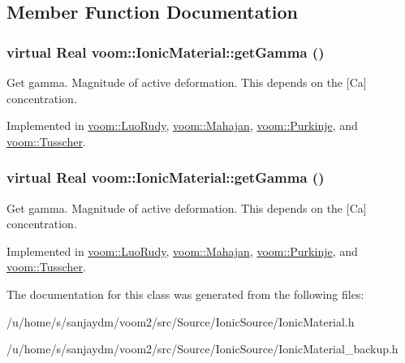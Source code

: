 \subsection{Member Function Documentation}
\hypertarget{classvoom_1_1_ionic_material_a98f1fa5bc5fa9ff6abfcd302111f8eac}{
\subsubsection[{getGamma}]{\setlength{\rightskip}{0pt plus 5cm}virtual Real voom::IonicMaterial::getGamma ()}}
\label{classvoom_1_1_ionic_material_a98f1fa5bc5fa9ff6abfcd302111f8eac}
Get gamma. Magnitude of active deformation. This depends on the \mbox{[}Ca\mbox{]} concentration. 

Implemented in \hyperlink{classvoom_1_1_luo_rudy_a698189fa1a8c96e7b443f95a9d7887be}{voom::LuoRudy}, \hyperlink{classvoom_1_1_mahajan_a909c20c75a95d45e00ead8930b4b3287}{voom::Mahajan}, \hyperlink{classvoom_1_1_purkinje_a337aa8f4b1ea0bd6f08635950cc39a2d}{voom::Purkinje}, and \hyperlink{classvoom_1_1_tusscher_a1c3c2dd28860736ebeb0f602a6b8caa8}{voom::Tusscher}.\hypertarget{classvoom_1_1_ionic_material_a98f1fa5bc5fa9ff6abfcd302111f8eac}{
\subsubsection[{getGamma}]{\setlength{\rightskip}{0pt plus 5cm}virtual Real voom::IonicMaterial::getGamma ()}}
\label{classvoom_1_1_ionic_material_a98f1fa5bc5fa9ff6abfcd302111f8eac}
Get gamma. Magnitude of active deformation. This depends on the \mbox{[}Ca\mbox{]} concentration. 

Implemented in \hyperlink{classvoom_1_1_luo_rudy_a698189fa1a8c96e7b443f95a9d7887be}{voom::LuoRudy}, \hyperlink{classvoom_1_1_mahajan_a909c20c75a95d45e00ead8930b4b3287}{voom::Mahajan}, \hyperlink{classvoom_1_1_purkinje_a337aa8f4b1ea0bd6f08635950cc39a2d}{voom::Purkinje}, and \hyperlink{classvoom_1_1_tusscher_a1c3c2dd28860736ebeb0f602a6b8caa8}{voom::Tusscher}.

The documentation for this class was generated from the following files:\begin{DoxyCompactItemize}
\item 
/u/home/s/sanjaydm/voom2/src/Source/IonicSource/IonicMaterial.h\item 
/u/home/s/sanjaydm/voom2/src/Source/IonicSource/IonicMaterial\_\-backup.h\end{DoxyCompactItemize}
